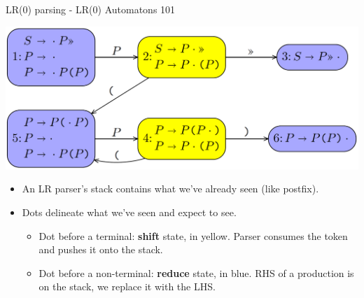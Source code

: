 \documentclass[10pt]{beamer}
\begin{document}
\begin{frame}[fragile]{LR(0) parsing - LR(0) Automatons 101}

\begin{center}
\includegraphics[scale=0.18]{lr0-automaton.png}
\end{center}

\begin{itemize}

 \item An LR parser's stack contains what we've already seen (like postfix).

\item Dots delineate what we've seen and expect to see.
\begin{itemize}
\item Dot before a terminal: \textbf{shift} state, in yellow. Parser consumes the token and pushes it onto the stack.
\item Dot before a non-terminal: \textbf{reduce} state, in blue. RHS of a production is on the stack, we replace it with the LHS.
\end{itemize}

\end{itemize}

\end{frame}
\end{document}
